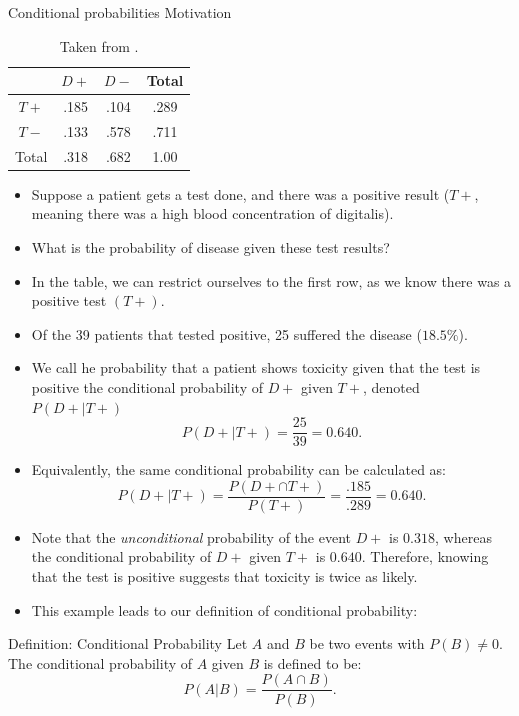\begin{frame}[allowframebreaks]{Conditional probabilities Motivation}
    \begin{table}
    \centering
    \begin{tabular}{c|cc|c}
            & $D+$  & $D-$ & Total \\\hline
      $T+$  & .185  & .104 & .289 \\
      $T-$  & .133  & .578 & .711 \\\hline
      Total & .318  & .682 & 1.00 \\
    \end{tabular}
    \caption{\label{tab:digitalisProps}Taken from \citep[][Chapter~1]{rice07}.}
  \end{table}
  
  \begin{itemize}
    \item Suppose a patient gets a test done, and there was a positive result ($T+$, meaning there was a high blood concentration of digitalis).
    \item What is the probability of disease given these test results?
  \end{itemize}
  
  \begin{itemize}
    \item In the table, we can restrict ourselves to the first row, as we know there was a positive test $(T+)$. 
    \item Of the 39 patients that tested positive, 25 suffered the disease ($18.5\%$).
    \item We call he probability that a patient shows toxicity given that the test is positive the \alert{conditional probability} of $D+$ given $T+$, denoted $P(D+ | T+)$
  $$
  P(D+ | T+) = \frac{25}{39} = 0.640.
  $$
  
    \item Equivalently, the same conditional probability can be calculated as:
  $$
  P(D+ | T+) = \frac{P(D+ \cap T+)}{P(T+)} = \frac{.185}{.289} = 0.640.
  $$
  
    \item Note that the \emph{unconditional} probability of the event $D+$ is $0.318$, whereas the conditional probability of $D+$ given $T+$ is $0.640$. Therefore, knowing that the test is positive suggests that toxicity is twice as likely.
  
    \item This example leads to our definition of conditional probability:
  \end{itemize}
  
  \begin{block}{Definition: Conditional Probability}
    Let $A$ and $B$ be two events with $P(B) \neq 0$. The conditional probability of $A$ given $B$ is defined to be:
    $$
    P(A|B) = \frac{P(A \cap B)}{P(B)}.
    $$
  \end{block}
  

\end{frame}
